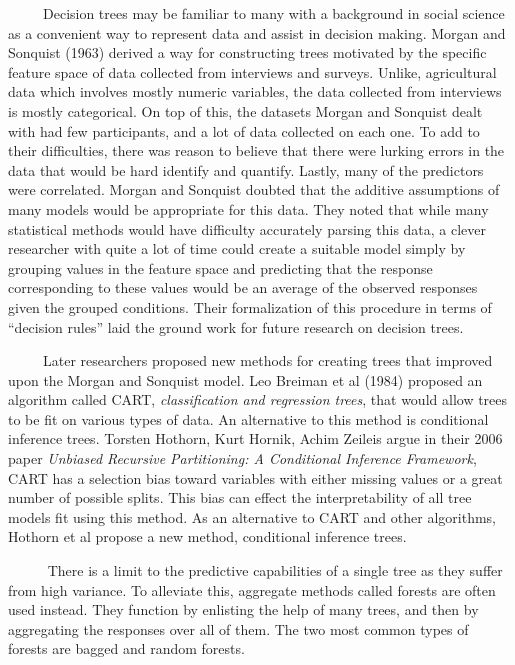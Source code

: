 \documentclass[12pt,twoside]{reedthesis}
\begin{document}
  ~~~~~Decision trees may be familiar to many with a background in social
  science as a convenient way to represent data and assist in decision
  making. Morgan and Sonquist (1963) derived a way for constructing trees
  motivated by the specific feature space of data collected from
  interviews and surveys. Unlike, agricultural data which involves mostly
  numeric variables, the data collected from interviews is mostly
  categorical. On top of this, the datasets Morgan and Sonquist dealt with
  had few participants, and a lot of data collected on each one. To add to
  their difficulties, there was reason to believe that there were lurking
  errors in the data that would be hard identify and quantify. Lastly,
  many of the predictors were correlated. Morgan and Sonquist doubted that
  the additive assumptions of many models would be appropriate for this
  data. They noted that while many statistical methods would have
  difficulty accurately parsing this data, a clever researcher with quite
  a lot of time could create a suitable model simply by grouping values in
  the feature space and predicting that the response corresponding to
  these values would be an average of the observed responses given the
  grouped conditions. Their formalization of this procedure in terms of
  ``decision rules'' laid the ground work for future research on decision
  trees.
  
  ~~~~~Later researchers proposed new methods for creating trees that
  improved upon the Morgan and Sonquist model. Leo Breiman et al (1984)
  proposed an algorithm called CART, \emph{classification and regression
  trees}, that would allow trees to be fit on various types of data. An
  alternative to this method is conditional inference trees. Torsten
  Hothorn, Kurt Hornik, Achim Zeileis argue in their 2006 paper
  \emph{Unbiased Recursive Partitioning: A Conditional Inference
  Framework}, CART has a selection bias toward variables with either
  missing values or a great number of possible splits. This bias can
  effect the interpretability of all tree models fit using this method. As
  an alternative to CART and other algorithms, Hothorn et al propose a new
  method, conditional inference trees.
  
  ~~~~~ There is a limit to the predictive capabilities of a single tree
  as they suffer from high variance. To alleviate this, aggregate methods
  called forests are often used instead. They function by enlisting the
  help of many trees, and then by aggregating the responses over all of
  them. The two most common types of forests are bagged and random
  forests.
  
\end{document}
